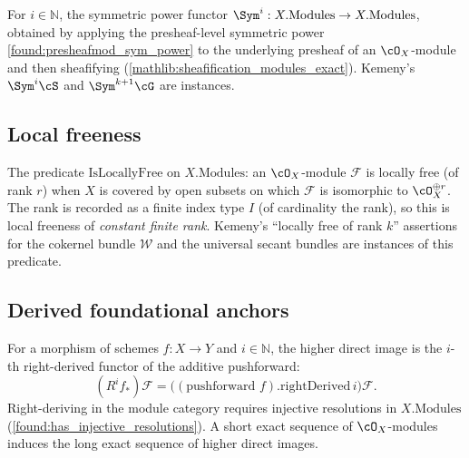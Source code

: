 \begin{definition}\leanok
  \label{found:oxmod_sym_power}
  For \(i\in\mathbb N\), the symmetric power functor
  \(\Sym^i:X.\mathrm{Modules}\to X.\mathrm{Modules}\), obtained by applying the
  presheaf-level symmetric power \cref{found:presheafmod_sym_power} to the
  underlying presheaf of an \(\cO_X\)-module and then sheafifying
  (\cref{mathlib:sheafification_modules_exact}).  Kemeny's \(\Sym^i\cS\) and
  \(\Sym^{k+1}\cG\) are instances.
\end{definition}

\subsection{Local freeness}

\begin{definition}
  \leanok
  \label{found:locally_free}
  The predicate \(\mathrm{IsLocallyFree}\) on \(X.\mathrm{Modules}\): an
  \(\cO_X\)-module \(\mathcal F\) is locally free (of rank \(r\)) when \(X\) is
  covered by open subsets on which \(\mathcal F\) is isomorphic to
  \(\cO_X^{\oplus r}\).  The rank is recorded as a finite index type \(I\) (of
  cardinality the rank), so this is local freeness of \emph{constant finite
  rank}.  Kemeny's ``locally free of rank \(k\)'' assertions for the cokernel
  bundle \(\mathcal W\) and the universal secant bundles are instances of this
  predicate.
\end{definition}

\subsection{Derived foundational anchors}

\begin{definition}
  \leanok
  \label{def:peer_higher_direct_image}
  For a morphism of schemes \(f:X\to Y\) and \(i\in\mathbb N\), the higher direct
  image is the \(i\)-th right-derived functor of the additive pushforward:
  \[
    (R^if_*)\mathcal F=\bigl((\text{pushforward }f).\mathrm{rightDerived}\,i\bigr)\mathcal F .
  \]
  Right-deriving in the module category requires injective resolutions in
  \(X.\mathrm{Modules}\) (\cref{found:has_injective_resolutions}).  A short exact
  sequence of \(\cO_X\)-modules induces the long exact sequence of higher direct
  images.
\end{definition}

